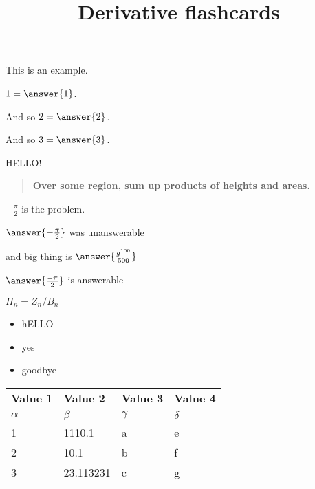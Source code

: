 \documentclass{ximera}
\title{Derivative flashcards}
\begin{document}
\begin{example}
  This is an example.

  $1 = \answer{1}$.
  
  \begin{problem}
    And so $2 = \answer{2}$.
  \end{problem}

  \begin{problem}
    And so $3 = \answer{3}$.
  \end{problem}
  
  \begin{hint}
    HELLO!
  \end{hint}  
\end{example}

\begin{quote}
\textbf{Over \textcolor{red!50!black}{some region},
\textcolor{green!70!black!70!blue}{sum up} products of
\textcolor{purple!50!blue!90!black}{heights} and \textcolor{blue!70!green}{areas}.}
\end{quote}

\begin{problem}
  $-\frac{\pi}{2}$ is the problem.
  
  $\answer{-\frac{\pi}{2}}$ was unanswerable

and
big thing is $\answer{\frac{g^{100}}{500}}$

$\answer{\frac{-\pi}{2}}$ is answerable
\end{problem}

\begin{definition}[Homology]
  $H_n = Z_n/B_n$ 
\end{definition}

\begin{itemize}
\item hELLO
\item yes
\item goodbye
\end{itemize}
\begin{exploration}
    \begin{tabular}{l|l|ll}
      \textbf{Value 1} & \textbf{Value 2} & \textbf{Value 3} & \textbf{Value 4}\\ %
      $\alpha$ & $\beta$ & $\gamma$ & $\delta$ \\ %
      \hline
      1 & 1110.1 & a & e\\ 
      2 & 10.1 & b & f\\ 
      3 & 23.113231 & c & g\\ 
    \end{tabular}
    \end{exploration}
\end{document}
